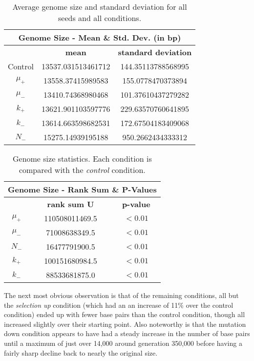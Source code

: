 \begin{table}[H]
	\begin{tabular}{|c|c|c|}
		\hline
		\multicolumn{3}{c}{\Large \textbf{Genome Size - Mean \& Std. Dev. (in bp)}} \\
		\hline
		 & \textbf{mean} & \textbf{standard deviation} \\
		 \hline
		 Control & 13537.031513461712 & 144.35113788568995 \\
		 \hline
		 $\mu_+$ & 13558.37415989583 & 155.0778470373894 \\
		 \hline
		 $\mu_-$ & 13410.74368980468 & 101.37610437279282 \\
		 \hline
		 $k_+$ & 13621.901103597776	& 229.63570760641895 \\
		 \hline
		 $k_-$ & 13614.663598682531 & 172.67504183409068 \\
		 \hline
		 $N_-$ & 15275.14939195188 & 950.2662434333312 \\
		 \hline
	\end{tabular}
	\caption[Genome size - mean and std. dev.]{Average genome size and standard deviation for all seeds and all conditions. }
	\label{table:genome_size_mean_and_std_dev}
\end{table}

\begin{table}[H]
	\centering
	\begin{tabular}{|c|c|c|}
		\hline
		\multicolumn{3}{c}{\Large Genome Size - Rank Sum \& P-Values} \\
		\hline
		& \textbf{rank sum U} & \textbf{p-value} \\
		\hline \hline
		$\mu_+$ & 110508011469.5 & $< 0.01$ \\
		\hline
		$\mu_-$ & 71008638349.5 & $< 0.01$ \\
		\hline
		$N_-$ & 16477791900.5 & $< 0.01$ \\
		\hline
		$k_+$ & 100151680984.5 & $< 0.01$ \\
		\hline
		$k_-$ & 88533681875.0 & $< 0.01$ \\
		\hline
	\end{tabular}
	\caption[Genome size statistics]{Genome size statistics. Each condition is compared with the \textit{control} condition.}
	\label{table:genome_size_stats}
\end{table} 

The next most obvious observation is that of the remaining conditions, all but the \textit{selection up} condition (which had an an increase of 11\% over the control condition) ended up with fewer base pairs than the control condition, though all increased slightly over their starting point. Also noteworthy is that the mutation down condition appears to have had a steady increase in the number of base pairs until a maximum of just over 14,000 around generation 350,000 before having a fairly sharp decline back to nearly the original size. 

